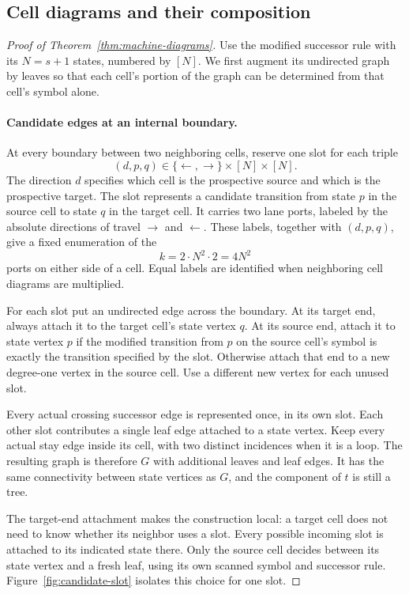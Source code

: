 \subsection{Cell diagrams and their composition}

\begin{proof}[Proof of Theorem~\ref{thm:machine-diagrams}]
Use the modified successor rule with its $N=s+1$ states, numbered
by $[N]$.  We first augment its undirected graph by leaves so that
each cell's portion of the graph can be determined from that cell's
symbol alone.

\paragraph{Candidate edges at an internal boundary.}
At every boundary between two neighboring cells, reserve one slot
for each triple
\[
 (d,p,q)\in\{\leftarrow,\rightarrow\}\times[N]\times[N].
\]
The direction $d$ specifies which cell is the prospective source
and which is the prospective target.  The slot represents a
candidate transition from state $p$ in the source cell to state
$q$ in the target cell.  It carries two lane ports, labeled by the
absolute directions of travel $\rightarrow$ and $\leftarrow$.
These labels, together with $(d,p,q)$, give a fixed enumeration of
the
\[
 k=2\cdot N^2\cdot 2=4N^2
\]
ports on either side of a cell.  Equal labels are identified when
neighboring cell diagrams are multiplied.

For each slot put an undirected edge across the boundary.  At its
target end, always attach it to the target cell's state vertex
$q$.  At its source end, attach it to state vertex $p$ if the
modified transition from $p$ on the source cell's symbol is exactly
the transition specified by the slot.  Otherwise attach that end
to a new degree-one vertex in the source cell.  Use a different new
vertex for each unused slot.

Every actual crossing successor edge is represented once, in its
own slot.  Each other slot contributes a single leaf edge attached
to a state vertex.  Keep every actual stay edge inside its cell,
with two distinct incidences when it is a loop.  The resulting
graph is therefore $G$ with additional leaves and leaf edges.
It has the same connectivity between state vertices as $G$, and
the component of $t$ is still a tree.

The target-end attachment makes the construction local: a target
cell does not need to know whether its neighbor uses a slot.
Every possible incoming slot is attached to its indicated state
there.  Only the source cell decides between its state vertex and
a fresh leaf, using its own scanned symbol and successor rule.
Figure~\ref{fig:candidate-slot} isolates this choice for one slot.



\end{proof}

